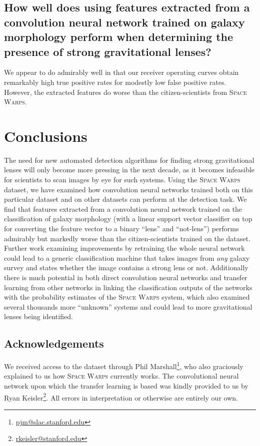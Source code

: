 \documentclass[10pt,twocolumn,letterpaper]{article}
\begin{document}
\subsection*{How well does using features extracted from a convolution neural
network trained on galaxy morphology perform when determining the presence of
strong gravitational lenses?}

We appear to do admirably well in that our receiver operating curves obtain
remarkably high true positive rates for modestly low false positive rates.
However, the extracted features do worse than the citizen-scientists from
\textsc{Space Warps}.

\section{Conclusions}

The need for new automated detection algorithms for finding strong
gravitational lenses will only become more pressing in the next decade, as it
becomes infeasible for scientists to scan images by eye for such systems. Using
the \textsc{Space Warps} dataset, we have examined how convolution neural
networks trained both on this particular dataset and on other datasets can
perform at the detection task.
We find that features extracted from a convolution neural network trained on
the classification of galaxy morphology (with a linear support vector
classifier on top for converting the feature vector to a binary ``lens'' and
``not-lens'') performs admirably but markedly worse than the citizen-scientists
trained on the dataset. Further work examining improvements by retraining the
whole neural network could lead to a generic classification machine that takes
images from \textit{any} galaxy survey and states whether the image contains a
strong lens or not. Additionally there is much potential in both direct
convolution neural networks and transfer learning from other networks in
linking the classification outputs of the networks with the probability
estimates of the \textsc{Space Warps} system, which also examined several
thousands more ``unknown'' systems and could lead to more gravitational lenses
being identified.

\subsection*{Acknowledgements}
We received access to the dataset through Phil Marshall\footnote{\url{pjm@slac.stanford.edu}}, who also graciously explained to us how
\textsc{Space Warps}
currently works. The convolutional neural network upon which the transfer
learning is based was kindly provided to us by Ryan Keisler\footnote{\url{rkeisler@stanford.edu}}.
All errors in interpretation or otherwise are entirely our own.


{\small


}
\end{document}
